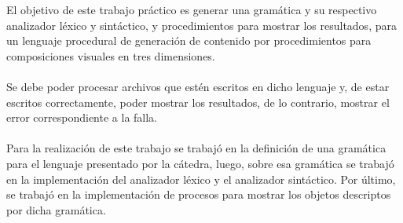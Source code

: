 El objetivo de este trabajo pr\'actico es generar una gram\'atica y su respectivo analizador l\'exico y sint\'actico, y procedimientos para mostrar los resultados, para un lenguaje procedural de generaci\'on de contenido por procedimientos para composiciones visuales en tres dimensiones. \\
\\
Se debe poder procesar archivos que est\'en escritos en dicho lenguaje y, de estar escritos correctamente, poder mostrar los resultados, de lo contrario, mostrar el error correspondiente a la falla. \\
\\
Para la realizaci\'on de este trabajo se trabaj\'o en la definici\'on de una gram\'atica para el lenguaje presentado por la c\'atedra, luego, sobre esa gram\'atica se trabaj\'o en la implementaci\'on del analizador l\'exico y el analizador sint\'actico. Por \'ultimo, se trabaj\'o en la implementaci\'on de procesos para mostrar los objetos descriptos por dicha gram\'atica.\\
